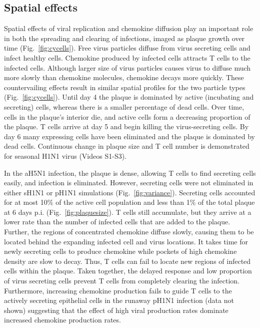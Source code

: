 \documentclass[10pt]{article}
\begin{document}
\subsection*{Spatial effects}

Spatial effects of viral replication and chemokine diffusion play an important role in both the spreading and clearing of infections, imaged as plaque growth over time (Fig.~\ref{fig:cycells}).  Free virus particles diffuse from virus secreting cells and infect healthy cells.  Chemokine produced by infected cells attracts T cells to the infected cells.  Although larger size of virus particles causes virus to diffuse much more slowly than chemokine molecules, chemokine decays more quickly.  These countervailing effects result in similar spatial profiles for the two particle types (Fig.~\ref{fig:cycells}). Until day 4 the plaque is dominated by active (incubating and secreting) cells, whereas there is a smaller percentage of dead cells. Over time, cells in the plaque's interior die, and active cells form a decreasing proportion of the plaque. T cells arrive at day 5 and begin killing the virus-secreting cells. By day 6 many expressing cells have been eliminated and the plaque is dominated by dead cells.  Continuous change in plaque size and T cell number is demonstrated for seasonal H1N1 virus (Videos S1-S3).

In the aH5N1 infection, the plaque is dense, allowing T cells to find secreting cells easily, and infection is eliminated.  However, secreting cells were not eliminated in either sH1N1 or pH1N1 simulations (Fig.~\ref{fig:variance}).  Secreting cells accounted for at most 10\% of the active cell population and less than 1\% of the total plaque at 6 days p.i. (Fig.~\ref{fig:plaquesize}).  T cells still accumulate, but they arrive at a lower rate than the number of infected cells that are added to the plaque.  Further, the regions of concentrated chemokine diffuse slowly, causing them to be located behind the expanding infected cell and virus locations.  It takes time for newly secreting cells to produce chemokine while pockets of high chemokine density are slow to decay.  Thus, T cells can fail to locate new regions of infected cells within the plaque.  Taken together, the delayed response and low proportion of virus secreting cells prevent T cells from completely clearing the infection.  Furthermore, increasing chemokine production fails to guide T cells to the actively secreting epithelial cells in the runaway pH1N1 infection (data not shown) suggesting that the effect of high viral production rates dominate increased chemokine production rates.
\end{document}
